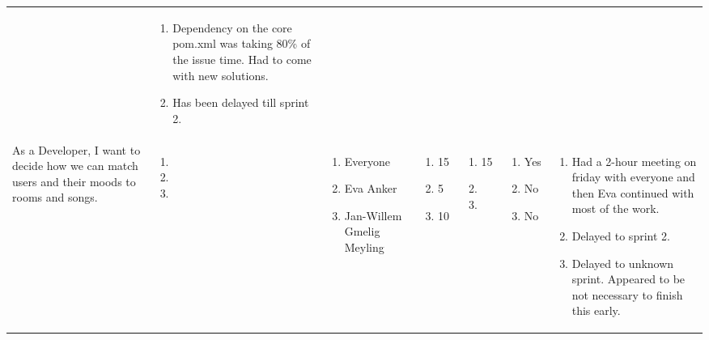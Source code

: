 \documentclass[11pt,a4paper]{article}
\begin{document}
\begin{table}[h]
\begin{tabular}{|p{4cm}|p{0.6cm}|p{2.0cm}|p{1.8cm}|p{1.8cm}|p{1.0cm}|p{5cm}}
& \begin{enumerate}[leftmargin=*,itemindent=0.1cm]
\item[] Dependency on the core pom.xml was taking 80\% of the issue time. Had to come with new solutions.
\item[] Has been delayed till sprint 2.
\end{enumerate}

\\

As a Developer, I want to decide how we can match users and their moods to rooms and songs. & \begin{enumerate}[leftmargin=*,itemindent=0.1cm]
\item 
\item
\item 
\end{enumerate}

& 
\begin{enumerate}[leftmargin=*,itemindent=0.1cm]
\item[] Everyone
\item[] Eva Anker
\item[] Jan-Willem Gmelig Meyling
\end{enumerate}

& 
\begin{enumerate}[leftmargin=*,itemindent=0.1cm]
\item[] 15 
\item[] 5 
\item[] 10 
\end{enumerate}
& \begin{enumerate}[leftmargin=*,itemindent=0.1cm]
\item[] 15 
\item[]
\item[] 
\end{enumerate}
& \begin{enumerate}[leftmargin=*,itemindent=0.1cm]
\item[] Yes
\item[] No
\item[] No
\end{enumerate}
& 
\begin{enumerate}[leftmargin=*,itemindent=0.1cm]
\item[] Had a 2-hour meeting on friday with everyone and then Eva continued with most of the work.
\item[] Delayed to sprint 2.
\item[] Delayed to unknown sprint. Appeared to be not necessary to finish this early.
\end{enumerate}
 \\
           
\end{tabular}
\end{table}
\end{document}
